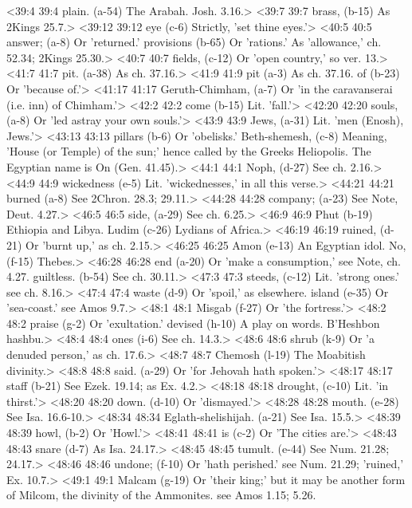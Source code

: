 <39:4 39:4  plain. (a-54)  The Arabah. Josh. 3.16.>
<39:7 39:7  brass, (b-15)  As 2Kings 25.7.>
<39:12 39:12  eye (c-6)  Strictly, 'set thine eyes.'>
<40:5 40:5  answer; (a-8)  Or 'returned.'
  provisions (b-65)  Or 'rations.' As 'allowance,' ch. 52.34; 2Kings 25.30.>
<40:7 40:7  fields, (c-12)  Or 'open country,' so ver. 13.>
<41:7 41:7  pit. (a-38) As ch. 37.16.>
<41:9 41:9  pit (a-3)  As ch. 37.16.
  of (b-23)  Or 'because of.'>
<41:17 41:17  Geruth-Chimham, (a-7)  Or 'in the caravanserai (i.e. inn) of Chimham.'>
<42:2 42:2  come (b-15)  Lit. 'fall.'>
<42:20 42:20  souls, (a-8)  Or 'led astray your own souls.'>
<43:9 43:9  Jews, (a-31)  Lit. 'men (Enosh), Jews.'>
<43:13 43:13  pillars (b-6)  Or 'obelisks.'
  Beth-shemesh, (c-8)  Meaning, 'House (or Temple) of the sun;' hence called by the  Greeks Heliopolis. The Egyptian name is On (Gen. 41.45).>
<44:1 44:1  Noph, (d-27)  See ch. 2.16.>
<44:9 44:9  wickedness (e-5)  Lit. 'wickednesses,' in all this verse.>
<44:21 44:21  burned (a-8)  See 2Chron. 28.3; 29.11.>
<44:28 44:28  company; (a-23)  See Note, Deut. 4.27.>
<46:5 46:5  side, (a-29)  See ch. 6.25.>
<46:9 46:9  Phut (b-19)  Ethiopia and Libya.
  Ludim (c-26)  Lydians of Africa.>
<46:19 46:19  ruined, (d-21)  Or 'burnt up,' as ch. 2.15.>
<46:25 46:25  Amon (e-13)  An Egyptian idol.
  No, (f-15)  Thebes.>
<46:28 46:28  end (a-20)  Or 'make a consumption,' see Note, ch. 4.27.
  guiltless. (b-54)  See ch. 30.11.>
<47:3 47:3  steeds, (c-12)  Lit. 'strong ones.' see ch. 8.16.>
<47:4 47:4  waste (d-9)  Or 'spoil,' as elsewhere.
  island (e-35)  Or 'sea-coast.' see Amos 9.7.>
<48:1 48:1  Misgab (f-27)  Or 'the fortress.'>
<48:2 48:2  praise (g-2)  Or 'exultation.'
  devised (h-10)  A play on words. B'Heshbon hashbu.>
<48:4 48:4  ones (i-6)  See ch. 14.3.>
<48:6 48:6  shrub (k-9)  Or 'a denuded person,' as ch. 17.6.>
<48:7 48:7  Chemosh (l-19)  The Moabitish divinity.>
<48:8 48:8  said. (a-29)  Or 'for Jehovah hath spoken.'>
<48:17 48:17  staff (b-21)  See Ezek. 19.14; as Ex. 4.2.>
<48:18 48:18  drought, (c-10)  Lit. 'in thirst.'>
<48:20 48:20  down. (d-10)  Or 'dismayed.'>
<48:28 48:28  mouth. (e-28)  See Isa. 16.6-10.>
<48:34 48:34  Eglath-shelishijah. (a-21)  See Isa. 15.5.>
<48:39 48:39  howl, (b-2)  Or 'Howl.'>
<48:41 48:41  is (c-2)  Or 'The cities are.'>
<48:43 48:43  snare (d-7)  As Isa. 24.17.>
<48:45 48:45  tumult. (e-44)  See Num. 21.28; 24.17.>
<48:46 48:46  undone; (f-10)  Or 'hath perished.' see Num. 21.29; 'ruined,' Ex. 10.7.>
<49:1 49:1  Malcam (g-19)  Or 'their king;' but it may be another form of Milcom, the  divinity of the Ammonites. see Amos 1.15; 5.26.
